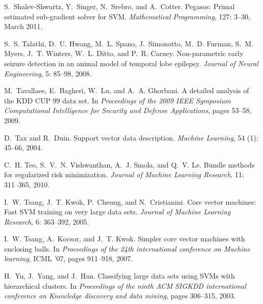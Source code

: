 \documentclass[twoside]{article}
\begin{document}
\begin{thebibliography}{45}
S.~Shalev-Shwartz, Y.~Singer, N.~Srebro, and A.~Cotter.
\newblock Pegasos: {P}rimal estimated sub-gradient solver for {SVM}.
\newblock \emph{Mathematical Programming}, 127: 3--30, March 2011.

S.~S. Talathi, D.~U. Hwang, M.~L. Spano, J.~Simonotto, M.~D. Furman, S.~M.
  Myers, J.~T. Winters, W.~L. Ditto, and P.~R. Carney.
\newblock Non-parametric early seizure detection in an animal model of temporal
  lobe epilepsy.
\newblock \emph{Journal of Neural Engineering}, 5: 85--98, 2008.

M.~Tavallaee, E.~Bagheri, W.~Lu, and A.~A. Ghorbani.
\newblock A detailed analysis of the {KDD CUP} 99 data set.
\newblock In \emph{Proceedings of the 2009 IEEE Symposium Computational
  Intelligence for Security and Defense Applications}, pages 53--58, 2009.

D.~Tax and R.~Duin.
\newblock Support vector data description.
\newblock \emph{Machine Learning}, 54 (1): 45--66, 2004.

C.~H. Teo, S.~V.~N. Vishwanthan, A.~J. Smola, and Q.~V. Le.
\newblock Bundle methods for regularized risk minimization.
\newblock \emph{Journal of Machine Learning Research}, 11: 311--365,
  2010.

I.~W. Tsang, J.~T. Kwok, P.~Cheung, and N.~Cristianini.
\newblock Core vector machines: {F}ast {SVM} training on very large data sets.
\newblock \emph{Journal of Machine Learning Research}, 6: 363--392,
  2005.

I.~W. Tsang, A.~Kocsor, and J.~T. Kwok.
\newblock Simpler core vector machines with enclosing balls.
\newblock In \emph{Proceedings of the 24th international conference on Machine
  learning}, ICML '07, pages 911--918, 2007.

H.~Yu, J.~Yang, and J.~Han.
\newblock Classifying large data sets using {SVM}s with hierarchical clusters.
\newblock In \emph{Proceedings of the ninth ACM SIGKDD international conference
  on Knowledge discovery and data mining}, pages 306--315, 2003.


\end{thebibliography}
\end{document}
